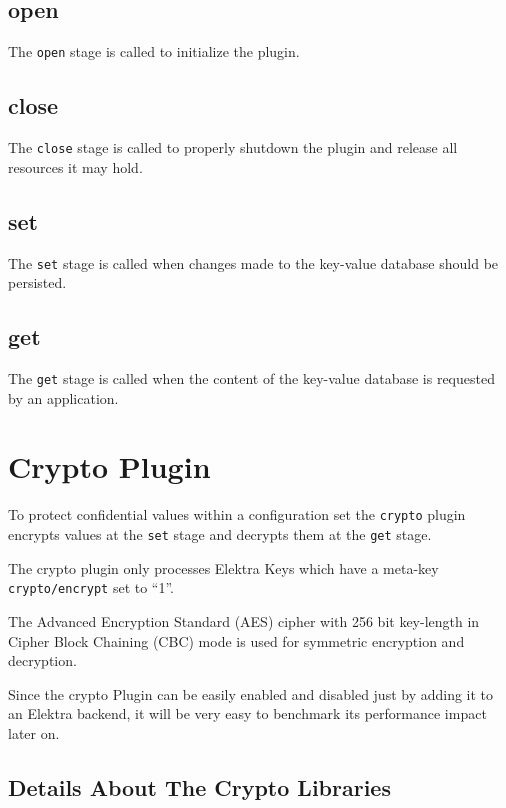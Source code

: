 \subsection{open}\label{open}

The \texttt{open} stage is called to initialize the plugin.

\subsection{close}\label{close}

The \texttt{close} stage is called to properly shutdown the plugin and
release all resources it may hold.

\subsection{set}\label{set}

The \texttt{set} stage is called when changes made to the key-value
database should be persisted.

\subsection{get}\label{get}

The \texttt{get} stage is called when the content of the key-value
database is requested by an application.

\section{Crypto Plugin}\label{crypto-plugin}

To protect confidential values within a configuration set the
\texttt{crypto} plugin encrypts values at the \texttt{set} stage and
decrypts them at the \texttt{get} stage.

The crypto plugin only processes Elektra Keys which have a meta-key
\texttt{crypto/encrypt} set to ``1''.

The Advanced Encryption Standard (AES) cipher with 256 bit key-length in
Cipher Block Chaining (CBC) mode is used for symmetric encryption and
decryption.

Since the crypto Plugin can be easily enabled and disabled just by adding it to an Elektra backend,
it will be very easy to benchmark its performance impact later on.

\subsection{Details About The Crypto
Libraries}\label{details-about-the-crypto-libraries}

